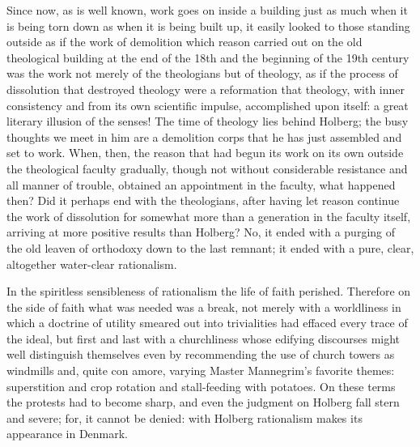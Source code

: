 \documentclass[12pt]{book}
\newcommand{\opage}[1]{\marginnote{\footnotesize\textit{[#1]}}}
\begin{document}
Since now, as is well known, work goes on inside a building just as much when
it is being torn down as when it is being built up, it easily looked to those
standing outside as if the work of demolition which reason carried out on the
old theological building at the end of the 18th and the beginning of the 19th
century was the work not merely of the theologians but of theology, as if the
process of dissolution that destroyed theology were a reformation that
theology, with inner consistency and from its own scientific impulse,
accomplished upon itself: a great literary illusion of the senses! The time of
theology lies behind Holberg; the busy thoughts we meet in him are a
demolition corps that he has just assembled and set to work. When, then, the
reason that had begun its work on its own outside the theological faculty
gradually, though not without considerable resistance and all manner of
trouble, obtained an appointment in the faculty, what happened then? Did it
perhaps end with the theologians, after having let reason continue the work
of dissolution for somewhat more than a generation in the
\opage{252}\setcounter{footnote}{0}%
faculty itself, arriving at more positive results than Holberg? No, it ended
with a purging of the old leaven of orthodoxy down to the last remnant; it
ended with a pure, clear, altogether water-clear rationalism.

In the spiritless sensibleness of rationalism the life of faith perished.
Therefore on the side of faith what was needed was a break, not merely with a
worldliness in which a doctrine of utility smeared out into trivialities had
effaced every trace of the ideal, but first and last with a churchliness whose
edifying discourses might well distinguish themselves even by recommending
the use of church towers as windmills and, quite con amore, varying Master
Mannegrim's favorite themes: superstition and crop rotation and stall-feeding
with potatoes. On these terms the protests had to become sharp, and even the
judgment on Holberg fall stern and severe; for, it cannot be denied: with
Holberg rationalism makes its appearance in Denmark.
\end{document}

